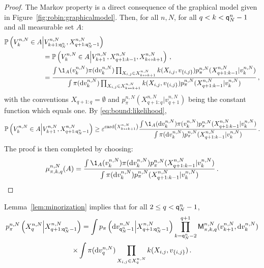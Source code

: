 \begin{proof}
The Markov property is a direct consequence of the graphical model given in Figure~\ref{fig:robin:graphicalmodel}. Then, for all $n,N$, for all $q< k < {\mathsf{q}}^{n}_{N}-1$ and all measurable set $A$:
\begin{align*}
\mathbb{P}\left(V^{n,N}_{k}\in A\middle|V^{n,N}_{k+1:\ordermax{n}{N}},X_{q+1:\ordermax{n}{N}-1}^{n,N}\right) &\\
 &\hspace{-3.2cm}= \mathbb{P}\left(V^{n,N}_{k}\in A\middle|V^{n,N}_{k+1},X^{n,N}_{q+1:k-1},X^{n,N}_{k\link k+1}\right)\eqsp,\\
 &\hspace{-3.2cm}= \frac{\int \1_{A}(v^{n,N}_{k})\pi(\rmd v^{n,N}_{k})\prod_{X_{i,j}\in X^{n,N}_{k\link k+1}}\condlik(X_{i,j},v_{\{i,j\}})p_{\pi}^{n,N}(X^{n,N}_{q+1:k-1}|v^{n,N}_{k})}{\int \pi(\rmd v^{n,N}_{k})\prod_{X_{i,j}\in X^{n,N}_{k\link k+1}}\condlik(X_{i,j},v_{\{i,j\}})p_{\pi}^{n,N}(X^{n,N}_{q+1:k-1}|v^{n,N}_{k})}\eqsp,
\end{align*}
with the conventions $X_{q+1:q} = \emptyset$ and $p_{\pi}^{n,N}(X^{n,N}_{q+1:q}|v^{n,N}_{q+1})$ being the constant function which equals one. By \eqref{eq:bound:likelihood},
\[
\mathbb{P}\left(V^{n,N}_{k}\in A\middle|V^{n,N}_{k+1},X_{q+1:\ordermax{n}{N}-1}^{n,N}\right)
\ge \varepsilon^{\card\left(X^{n,N}_{k\link k+1}\right)}\frac{\int \1_{A}(\rmd v^{n,N}_{k})\pi(v^{n,N}_{k})p_{\pi}^{n,N}(X^{n,N}_{q+1:k-1}|v^{n,N}_{k})}{\int \pi(\rmd v^{n,N}_{k})p_{\pi}^{n,N}(X^{n,N}_{q+1:k-1}|v^{n,N}_{k})}\eqsp. 
\]
The proof is then completed by choosing:
\[
\mu^{n,N}_{\pi,k,q}(A) = \frac{\int \1_{A}(v^{n,N}_{k})\pi(\rmd v^{n,N}_{k})p_{\pi}^{n,N}(X^{n,N}_{q+1:k-1}|v^{n,N}_{k})}{\int \pi(\rmd v^{n,N}_{k})p_{\pi}^{n,N}(X^{n,N}_{q+1:k-1}|v^{n,N}_{k})}\eqsp. 
\]
\end{proof}
Lemma~\ref{lem:minorization} implies that for all $2\le q< {\mathsf{q}}^{n}_{N}-1$,
\begin{multline*}
p_{\pi}^{n,N}\left(X^{n,N}_{q}\middle|X^{n,N}_{q+1:{\mathsf{q}}^{n}_{N}-1}\right) = \int p_{\pi}\left(\mathrm{d} v_{{\mathsf{q}}^{n}_{N}-1}^{n,N}\middle | X^{n,N}_{q+1:{\mathsf{q}}^{n}_{N}-1}\right) \prod_{k ={\mathsf{q}}^{n}_{N}-2}^{q+1}\mathsf{M}^{n,N}_{\pi,k,q}(v_{k+1}^{n,N},\mathrm{d} v_k^{n,N})\\
\times\int \pi(\mathrm{d} v_q^{n,N})\prod_{X_{i,j}\in X_{q}^{n,N}}k(X_{i,j},v_{\{i,j\}})\,.
\end{multline*}
